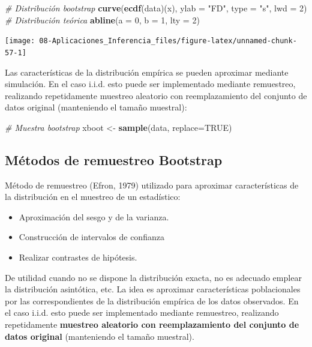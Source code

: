 \documentclass[]{book}
\newenvironment{Shaded}{\begin{snugshade}}{\end{snugshade}}
\newcommand{\KeywordTok}[1]{\textcolor[rgb]{0.13,0.29,0.53}{\textbf{#1}}}
\newcommand{\DataTypeTok}[1]{\textcolor[rgb]{0.13,0.29,0.53}{#1}}
\newcommand{\DecValTok}[1]{\textcolor[rgb]{0.00,0.00,0.81}{#1}}
\newcommand{\StringTok}[1]{\textcolor[rgb]{0.31,0.60,0.02}{#1}}
\newcommand{\CommentTok}[1]{\textcolor[rgb]{0.56,0.35,0.01}{\textit{#1}}}
\newcommand{\OtherTok}[1]{\textcolor[rgb]{0.56,0.35,0.01}{#1}}
\newcommand{\NormalTok}[1]{#1}
\theoremstyle{definition}
\theoremstyle{definition}
\theoremstyle{definition}
\theoremstyle{remark}
\begin{document}
\begin{Shaded}
\begin{Highlighting}[]
 \CommentTok{# Distribución bootstrap}
\KeywordTok{curve}\NormalTok{(}\KeywordTok{ecdf}\NormalTok{(data)(x), }\DataTypeTok{ylab =} \StringTok{"FD"}\NormalTok{, }\DataTypeTok{type =} \StringTok{"s"}\NormalTok{, }\DataTypeTok{lwd =} \DecValTok{2}\NormalTok{)}
\CommentTok{# Distribución teórica}
\KeywordTok{abline}\NormalTok{(}\DataTypeTok{a =} \DecValTok{0}\NormalTok{, }\DataTypeTok{b =} \DecValTok{1}\NormalTok{, }\DataTypeTok{lty =} \DecValTok{2}\NormalTok{) }
\end{Highlighting}
\end{Shaded}

\begin{center}\texttt{[image: 08-Aplicaciones\_Inferencia\_files/figure-latex/unnamed-chunk-57-1]} \end{center}

Las características de la distribución empírica se pueden aproximar
mediante simulación. En el caso i.i.d. esto puede ser implementado
mediante remuestreo, realizando repetidamente muestreo aleatorio con
reemplazamiento del conjunto de datos original (manteniendo el tamaño
muestral):

\begin{Shaded}
\begin{Highlighting}[]
 \CommentTok{# Muestra bootstrap}
\NormalTok{xboot <-}\StringTok{ }\KeywordTok{sample}\NormalTok{(data, }\DataTypeTok{replace=}\OtherTok{TRUE}\NormalTok{)}
\end{Highlighting}
\end{Shaded}

\subsection{Métodos de remuestreo
Bootstrap}\label{metodos-de-remuestreo-bootstrap}

Método de remuestreo (Efron, 1979) utilizado para aproximar
características de la distribución en el muestreo de un estadístico:

\begin{itemize}
\item
  Aproximación del sesgo y de la varianza.
\item
  Construcción de intervalos de confianza
\item
  Realizar contrastes de hipótesis.
\end{itemize}

De utilidad cuando no se dispone la distribución exacta, no es adecuado
emplear la distribución asintótica, etc. La idea es aproximar
características poblacionales por las correspondientes de la
distribución empírica de los datos observados. En el caso i.i.d. esto
puede ser implementado mediante remuestreo, realizando repetidamente
\textbf{muestreo aleatorio con reemplazamiento del conjunto de datos
original} (manteniendo el tamaño muestral).
\end{document}
